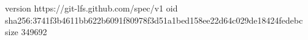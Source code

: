 version https://git-lfs.github.com/spec/v1
oid sha256:3741f3b4611bb622b6091f80978f3d51a1bed158ee22d64c029de18424fedebc
size 349692
